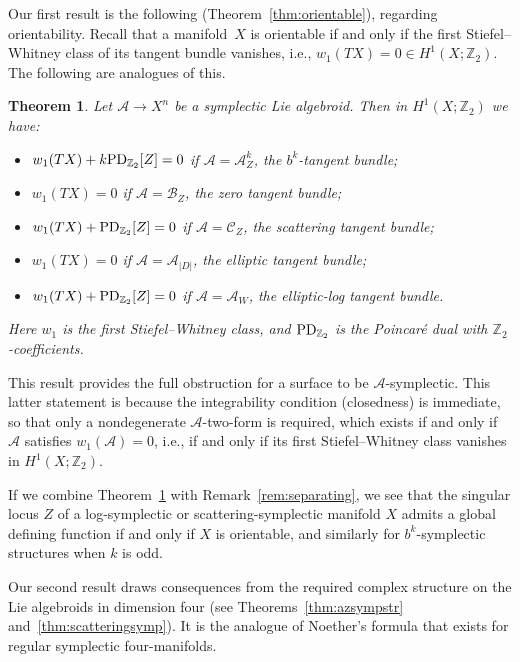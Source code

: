 \documentclass[10pt,a4paper]{amsart}
\numberwithin{equation}{section}
\newtheorem{Theorem}{Theorem}[section]
\begin{document}
Our first result is the following (Theorem~\ref{thm:orientable}), regarding orientability. Recall that a mani\-fold~$X$ is orientable if and only if the first Stiefel--Whitney class of its tangent bundle vanishes, i.e., $w_1(TX) = 0 \in H^1(X;\mathbb{Z}_2)$. The following are analogues of this.

\begin{Theorem}\label{thm:introorientable} Let $\mathcal{A} \to X^n$ be a symplectic Lie algebroid. Then in $H^1(X;\mathbb{Z}_2)$ we have:
\begin{itemize}\itemsep=0pt
	\item $w_1(TX) + k {\rm PD}_{\mathbb{Z}_2}[Z] = 0$ if $\mathcal{A} = \mathcal{A}_Z^k$, the $b^k$-tangent bundle;
	\item $w_1(TX) = 0$ if $\mathcal{A} = \mathcal{B}_Z$, the zero tangent bundle;
	\item $w_1(TX) + {\rm PD}_{\mathbb{Z}_2}[Z] = 0$ if $\mathcal{A} = \mathcal{C}_Z$, the scattering tangent bundle;
	\item $w_1(TX) = 0$ if $\mathcal{A} = \mathcal{A}_{|D|}$, the elliptic tangent bundle;
	\item $w_1(TX) + {\rm PD}_{\mathbb{Z}_2}[Z] = 0$ if $\mathcal{A} = \mathcal{A}_W$, the elliptic-log tangent bundle.
	\end{itemize}
Here $w_1$ is the first Stiefel--Whitney class, and ${\rm PD}_{\mathbb{Z}_2}$ is the Poincar\'e dual with $\mathbb{Z}_2$-coefficients.
\end{Theorem}

This result provides the full obstruction for a surface to be $\mathcal{A}$-symplectic. This latter statement is because the integrability condition (closedness) is immediate, so that only a nondegenerate $\mathcal{A}$-two-form is required, which exists if and only if $\mathcal{A}$ satisfies $w_1(\mathcal{A}) = 0$, i.e., if and only if its first Stiefel--Whitney class vanishes in $H^1(X;\mathbb{Z}_2)$.

\begin{Remark} If we combine Theorem~\ref{thm:introorientable} with Remark~\ref{rem:separating}, we see that the singular locus $Z$ of a log-symplectic or scattering-symplectic manifold $X$ admits a global defining function if and only if $X$ is orientable, and similarly for $b^k$-symplectic structures when $k$ is odd.
\end{Remark}

Our second result draws consequences from the required complex structure on the Lie algebroids in dimension four (see Theorems~\ref{thm:azsympstr} and~\ref{thm:scatteringsymp}). It is the analogue of Noether's formula \cite[Theorem~1.4.13]{GompfStipsicz99} that exists for regular symplectic four-manifolds.
\end{document}
